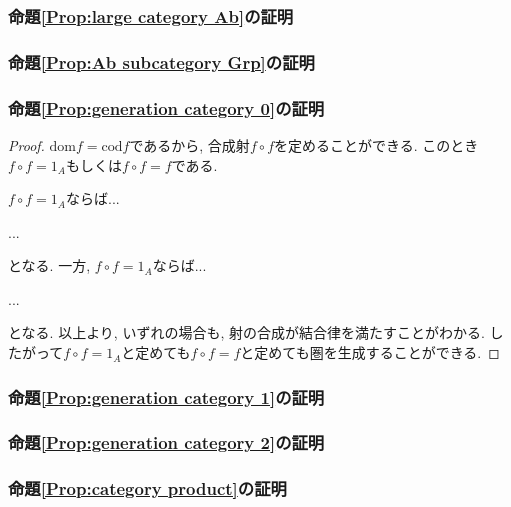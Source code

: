 \subsubsection{命題\ref{Prop:large category Ab}の証明}

\subsubsection{命題\ref{Prop:Ab subcategory Grp}の証明}

\subsubsection{命題\ref{Prop:generation category 0}の証明}
\begin{proof}
$\mathrm{dom} f=\mathrm{cod}f$であるから, 合成射$f\circ f$を定めることができる.
このとき$f\circ f=1_A$もしくは$f\circ f=f$である.

$f\circ f=1_A$ならば...

...

となる.
一方, $f\circ f=1_A$ならば...

...

となる.
以上より, いずれの場合も, 射の合成が結合律を満たすことがわかる.
したがって$f\circ f=1_A$と定めても$f\circ f=f$と定めても圏を生成することができる.
\end{proof}

\subsubsection{命題\ref{Prop:generation category 1}の証明}

\subsubsection{命題\ref{Prop:generation category 2}の証明}

\subsubsection{命題\ref{Prop:category product}の証明}
